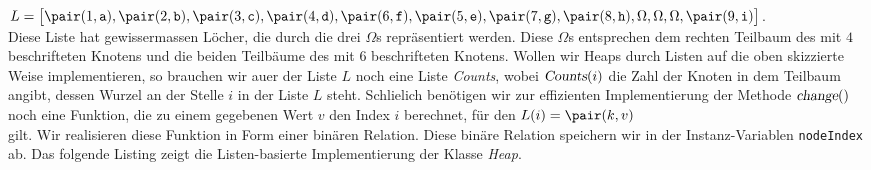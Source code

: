 \hspace*{1.3cm} $L = \bigl[ \pair(1,\mathtt{a}), \pair(2,\mathtt{b}),
\pair(3,\mathtt{c}), \pair(4,\mathtt{d}), \pair(6,\mathtt{f}), 
\pair(5,\mathtt{e}), \pair(7,\mathtt{g}), \pair(8,\mathtt{h}), \Omega, \Omega,
\Omega, \pair(9, \mathtt{i}) \bigr]$.
\\[0.1cm]
Diese Liste hat gewissermassen L\"ocher, die durch die drei $\Omega$s repr\"asentiert
werden. Diese $\Omega$s entsprechen dem rechten Teilbaum des mit $4$ beschrifteten Knotens
und die beiden Teilb\"aume des mit $6$ beschrifteten Knotens.
Wollen wir Heaps durch Listen auf die oben skizzierte Weise implementieren, so brauchen wir au\3er der Liste $L$ noch
eine Liste \textsl{Counts}, wobei $\textsl{Counts}(i)$ die Zahl der Knoten in dem Teilbaum
angibt, dessen Wurzel an der Stelle $i$ in der Liste $L$ steht. 
Schlie\3lich ben\"otigen wir zur effizienten Implementierung der Methode $\textsl{change}()$
noch eine Funktion, die zu einem gegebenen Wert $v$ den Index $i$ berechnet, f\"ur den 
 $L(i) = \pair(k,v)$ \\[0.1cm]
gilt.  Wir realisieren diese Funktion in Form einer bin\"aren Relation.  Diese bin\"are
Relation speichern wir in der Instanz-Variablen \texttt{nodeIndex} ab.
Das folgende Listing zeigt die Listen-basierte Implementierung der Klasse \textsl{Heap}.

